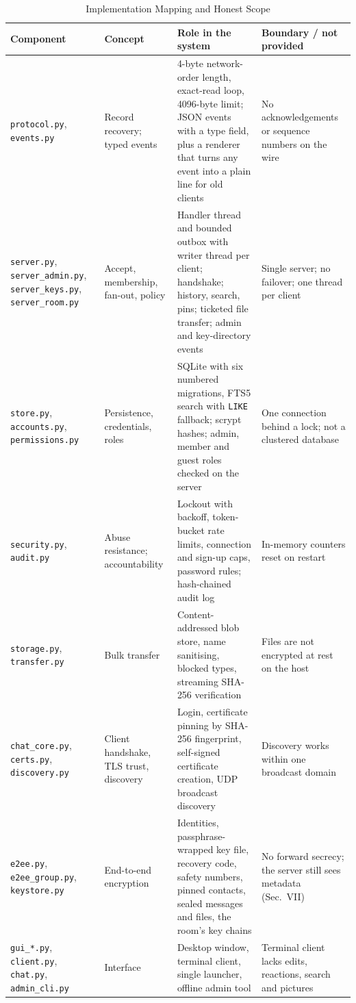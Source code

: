 \documentclass[conference]{IEEEtran}
\newcommand{\code}[1]{\texttt{#1}}
\begin{document}
\begin{table}[t]
\centering
\caption{Implementation Mapping and Honest Scope}
\label{tab:mapping}
\footnotesize
\begin{tabularx}{\textwidth}{@{}>{\raggedright\arraybackslash}p{3.6cm} >{\raggedright\arraybackslash}p{2.9cm} Y Y@{}}
\toprule
\textbf{Component} & \textbf{Concept} & \textbf{Role in the system} & \textbf{Boundary / not provided} \\
\midrule
\code{protocol.py}, \code{events.py} & Record recovery; typed events & 4-byte network-order length, exact-read loop, 4096-byte limit; JSON events with a type field, plus a renderer that turns any event into a plain line for old clients & No acknowledgements or sequence numbers on the wire \\
\code{server.py}, \code{server\_admin.py}, \code{server\_keys.py}, \code{server\_room.py} & Accept, membership, fan-out, policy & Handler thread and bounded outbox with writer thread per client; handshake; history, search, pins; ticketed file transfer; admin and key-directory events & Single server; no failover; one thread per client \\
\code{store.py}, \code{accounts.py}, \code{permissions.py} & Persistence, credentials, roles & SQLite with six numbered migrations, FTS5 search with \code{LIKE} fallback; scrypt hashes; admin, member and guest roles checked on the server & One connection behind a lock; not a clustered database \\
\code{security.py}, \code{audit.py} & Abuse resistance; accountability & Lockout with backoff, token-bucket rate limits, connection and sign-up caps, password rules; hash-chained audit log & In-memory counters reset on restart \\
\code{storage.py}, \code{transfer.py} & Bulk transfer & Content-addressed blob store, name sanitising, blocked types, streaming SHA-256 verification & Files are not encrypted at rest on the host \\
\code{chat\_core.py}, \code{certs.py}, \code{discovery.py} & Client handshake, TLS trust, discovery & Login, certificate pinning by SHA-256 fingerprint, self-signed certificate creation, UDP broadcast discovery & Discovery works within one broadcast domain \\
\code{e2ee.py}, \code{e2ee\_group.py}, \code{keystore.py} & End-to-end encryption & Identities, passphrase-wrapped key file, recovery code, safety numbers, pinned contacts, sealed messages and files, the room's key chains & No forward secrecy; the server still sees metadata (Sec.~VII) \\
\code{gui\_*.py}, \code{client.py}, \code{chat.py}, \code{admin\_cli.py} & Interface & Desktop window, terminal client, single launcher, offline admin tool & Terminal client lacks edits, reactions, search and pictures \\
\bottomrule
\end{tabularx}
\end{table}
\end{document}
